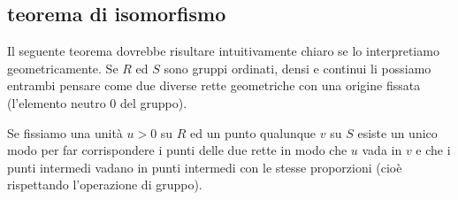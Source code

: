 \subsection{teorema di isomorfismo}

% 
% 

Il seguente teorema dovrebbe risultare intuitivamente chiaro 
se lo interpretiamo geometricamente. 
Se $R$ ed $S$ sono gruppi ordinati, densi e continui li possiamo 
entrambi pensare come due diverse rette geometriche con una origine fissata
(l'elemento neutro $0$ del gruppo).

Se fissiamo una unità $u>0$ su $R$ ed un punto qualunque $v$ su $S$ 
esiste un unico modo per far corrispondere i punti delle due rette 
in modo che $u$ vada in $v$ e che i punti intermedi vadano in punti 
intermedi con le stesse proporzioni (cioè rispettando l'operazione
di gruppo).

